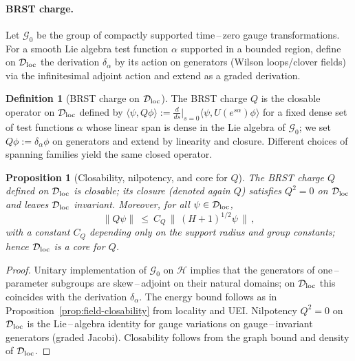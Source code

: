 \documentclass[11pt]{amsart}
\theoremstyle{plain}
\newtheorem{proposition}[theorem]{Proposition}
\theoremstyle{definition}
\newtheorem{definition}[theorem]{Definition}
\theoremstyle{remark}
\begin{document}
\paragraph{BRST charge.}
Let $\mathcal G_0$ be the group of compactly supported time\,–\,zero gauge transformations. For a smooth Lie algebra test function $\alpha$ supported in a bounded region, define on $\mathcal D_{\rm loc}$ the derivation $\delta_\alpha$ by its action on generators (Wilson loops/clover fields) via the infinitesimal adjoint action and extend as a graded derivation.

\begin{definition}[BRST charge on $\mathcal D_{\rm loc}$]\label{def:brst}
The BRST charge $Q$ is the closable operator on $\mathcal D_{\rm loc}$ defined by $\langle\psi, Q\phi\rangle:=\frac{d}{ds}\big|_{s=0}\langle\psi, U(e^{s\alpha})\phi\rangle$ for a fixed dense set of test functions $\alpha$ whose linear span is dense in the Lie algebra of $\mathcal G_0$; we set $Q\phi:=\delta_\alpha\phi$ on generators and extend by linearity and closure. Different choices of spanning families yield the same closed operator.
\end{definition}

\begin{proposition}[Closability, nilpotency, and core for $Q$]\label{prop:brst-closable}
The BRST charge $Q$ defined on $\mathcal D_{\rm loc}$ is closable; its closure (denoted again $Q$) satisfies $Q^2=0$ on $\mathcal D_{\rm loc}$ and leaves $\mathcal D_{\rm loc}$ invariant. Moreover, for all $\psi\in\mathcal D_{\rm loc}$,
\[
  \|Q\psi\|\ \le\ C_Q\,\big\|\,(H+1)^{1/2}\psi\,\big\|\,,
\]
with a constant $C_Q$ depending only on the support radius and group constants; hence $\mathcal D_{\rm loc}$ is a core for $Q$.
\end{proposition}
\begin{proof}
Unitary implementation of $\mathcal G_0$ on $\mathcal H$ implies that the generators of one\,–\,parameter subgroups are skew\,–\,adjoint on their natural domains; on $\mathcal D_{\rm loc}$ this coincides with the derivation $\delta_\alpha$. The energy bound follows as in Proposition~\ref{prop:field-closability} from locality and UEI. Nilpotency $Q^2=0$ on $\mathcal D_{\rm loc}$ is the Lie\,–\,algebra identity for gauge variations on gauge\,–\,invariant generators (graded Jacobi). Closability follows from the graph bound and density of $\mathcal D_{\rm loc}$.
\end{proof}
\end{document}
